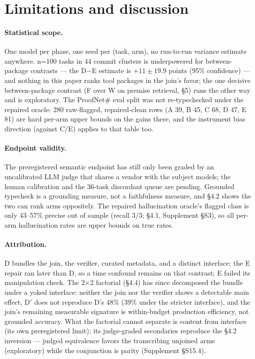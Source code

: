 \documentclass[10pt]{article}
\newcommand{\Ssec}[1]{Supplement \S #1}
\begin{document}
\section{Limitations and discussion}\label{sec:limitations}

\paragraph{Statistical scope.} One model per phase, one seed per (task,
arm), no run-to-run variance estimate anywhere. n=100 tasks in 44 commit
clusters is underpowered for between-package contrasts --- the D$-$E
estimate is $+11 \pm 19.9$ points (95\% confidence) --- and nothing
in this paper ranks
tool packages in the join's favor; the one decisive between-package
contrast (F over W on premise retrieval, \S 5) runs the other way and is
exploratory. The ProofNet\# eval split was not re-typechecked under the
repaired oracle: 280 raw-flagged, repaired-clean rows (A 39, B 45, C 68,
D 47, E 81) are hard per-arm upper bounds on the gains there, and the
instrument bias direction (against C/E) applies to that table too.

\paragraph{Endpoint validity.} The preregistered semantic endpoint has
still only been graded by an uncalibrated LLM judge that shares a vendor
with the subject models; the human calibration and the 36-task
discordant queue are pending. Grounded typecheck is a grounding measure,
not a faithfulness measure, and \S 4.2 shows the two can rank arms
oppositely. The repaired hallucination oracle's flagged class is only
43--57\% precise out of sample (recall 3/3; \S 4.1, \Ssec{S3}), so all
per-arm hallucination rates are upper bounds on true rates.

\paragraph{Attribution.} D bundles the join, the verifier, curated
metadata, and a distinct interface; the E repair ran later than D, so a
time confound remains on that contrast; E failed its manipulation check.
The 2$\times$2 factorial (\S 4.4) has since decomposed the bundle under
a yoked interface: neither the join nor the verifier shows a detectable
main effect, D$'$ does not reproduce D's 48\% (39\% under the stricter
interface), and the join's remaining measurable signature is
within-budget production efficiency, not grounded accuracy. What the
factorial cannot separate is content from interface (its own
preregistered limit); its judge-graded secondaries reproduce the
\S 4.2 inversion --- judged equivalence favors the transcribing
unjoined arms (exploratory) while the conjunction is parity
(\Ssec{S15.4}).
\end{document}

